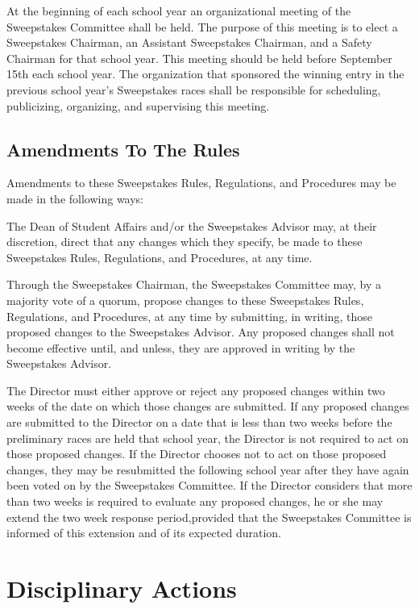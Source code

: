 \documentclass[openany]{book}
\begin{document}
At the beginning of each school year an organizational meeting of the Sweepstakes Committee shall be held. The purpose of this meeting is to elect a Sweepstakes Chairman, an Assistant Sweepstakes Chairman, and a Safety Chairman for that school year. This meeting should be held before September 15th each school year. The organization that sponsored the winning entry in the previous school year's Sweepstakes races shall be responsible for scheduling, publicizing, organizing, and supervising this meeting.

\subsection{Amendments To The Rules}

Amendments to these Sweepstakes Rules, Regulations, and Procedures may be made in the following ways:

The Dean of Student Affairs and/or the Sweepstakes Advisor may, at their discretion, direct that any changes which they specify, be made to these Sweepstakes Rules, Regulations, and Procedures, at any time.

Through the Sweepstakes Chairman, the Sweepstakes Committee may, by a majority vote of a quorum, propose changes to these Sweepstakes Rules, Regulations, and Procedures, at any time by submitting, in writing, those proposed changes to the Sweepstakes Advisor. Any proposed changes shall not become effective until, and unless, they are approved in writing by the Sweepstakes Advisor.

The Director must either approve or reject any proposed changes within two weeks of the date on which those changes are submitted. If any proposed changes are submitted to the Director on a date that is less than two weeks before the preliminary races are held that school year, the Director is not required to act on those proposed changes. If the Director chooses not to act on those proposed changes, they may be resubmitted the following school year after they have again been voted on by the Sweepstakes Committee. If the Director considers that more than two weeks is required to evaluate any proposed changes, he or she may extend the two week response period,provided that the Sweepstakes Committee is informed of this extension and of its expected duration.

\section{Disciplinary Actions}
\end{document}
